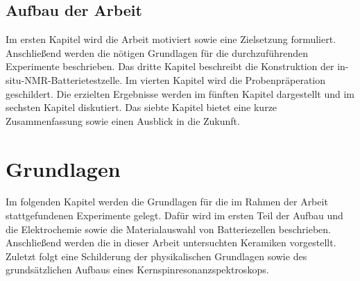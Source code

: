 \documentclass[a4paper, 11pt, headsepline,footsepline,twoside,abstract]{scrbook}
\begin{document}
\section{Aufbau der Arbeit}
Im ersten Kapitel wird die Arbeit motiviert sowie eine Zielsetzung formuliert. Anschließend werden die nötigen Grundlagen für die durchzuführenden Experimente beschrieben. Das dritte Kapitel beschreibt die Konstruktion der in-situ-NMR-Batterietestzelle. Im vierten Kapitel wird die Probenpräperation geschildert. Die erzielten Ergebnisse werden im fünften Kapitel dargestellt und im sechsten Kapitel diskutiert. Das siebte Kapitel bietet eine kurze Zusammenfassung sowie einen Ausblick in die Zukunft.
\chapter{Grundlagen}
Im folgenden Kapitel werden die Grundlagen für die im Rahmen der Arbeit stattgefundenen Experimente gelegt. Dafür wird im ersten Teil der Aufbau und die Elektrochemie sowie die Materialauswahl von Batteriezellen beschrieben. Anschließend werden die in dieser Arbeit untersuchten Keramiken vorgestellt. Zuletzt folgt eine Schilderung der physikalischen Grundlagen sowie des grundsätzlichen Aufbaus eines Kernspinresonanzspektroskops.
\end{document}
